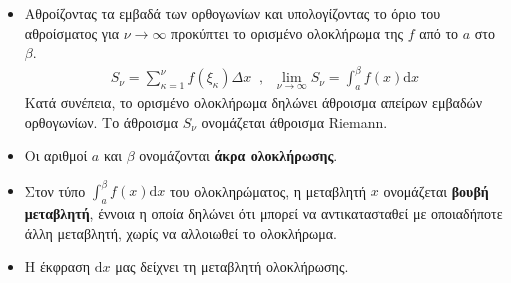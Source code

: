 \documentclass[twoside,nofonts]{article}
\begin{document}
\begin{itemize}[itemsep=0mm]
\begin{center}
\end{center}
\item Αθροίζοντας τα εμβαδά των ορθογωνίων και υπολογίζοντας το όριο του αθροίσματος για $ \nu\rightarrow\infty $ προκύπτει το ορισμένο ολοκλήρωμα της $ f $ από το $ a $ στο $ \beta $.
\begin{gather*}
S_\nu=\sum_{\kappa=1}^{\nu}f(\xi_\kappa)\varDelta x\;\;,\;\;
\lim_{\nu\rightarrow\infty}S_\nu=\int_{a}^{\beta}f(x)\mathrm{d}x
\end{gather*}
Κατά συνέπεια, το ορισμένο ολοκλήρωμα δηλώνει άθροισμα απείρων εμβαδών ορθογωνίων. Το άθροισμα $ S_\nu $ ονομάζεται άθροισμα Riemann.
\item Οι αριθμοί $ a $ και $ \beta $ ονομάζονται \textbf{άκρα ολοκλήρωσης}.
\item Στον τύπο $ \int_{a}^{\beta}f(x)\mathrm{d}x $ του ολοκληρώματος, η μεταβλητή $ x $ ονομάζεται \textbf{βουβή μεταβλητή}, έννοια η οποία δηλώνει ότι μπορεί να αντικατασταθεί με οποιαδήποτε άλλη μεταβλητή, χωρίς να αλλοιωθεί το ολοκλήρωμα.
\item Η έκφραση $ \mathrm{d}x $ μας δείχνει τη μεταβλητή ολοκλήρωσης.
\end{itemize}
\end{document}
